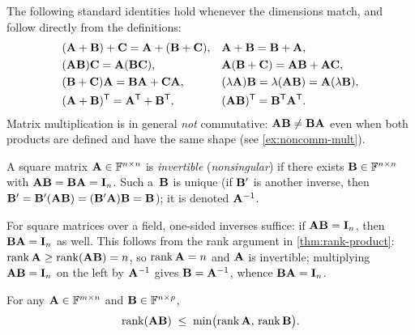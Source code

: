 \begin{remark}
\label{rem:matrix-op-laws}
The following standard identities hold whenever the dimensions match,
and follow directly from the definitions:
\begin{align*}
  &(\mathbf{A} + \mathbf{B}) + \mathbf{C} = \mathbf{A} + (\mathbf{B} + \mathbf{C}),
  & &\mathbf{A} + \mathbf{B} = \mathbf{B} + \mathbf{A}, \\
  &(\mathbf{A}\mathbf{B})\mathbf{C} = \mathbf{A}(\mathbf{B}\mathbf{C}),
  & &\mathbf{A}(\mathbf{B} + \mathbf{C}) = \mathbf{A}\mathbf{B} + \mathbf{A}\mathbf{C}, \\
  &(\mathbf{B} + \mathbf{C})\mathbf{A} = \mathbf{B}\mathbf{A} + \mathbf{C}\mathbf{A},
  & &(\lambda \mathbf{A})\mathbf{B} = \lambda(\mathbf{A}\mathbf{B}) = \mathbf{A}(\lambda \mathbf{B}), \\
  &(\mathbf{A} + \mathbf{B})^{\mathsf{T}} = \mathbf{A}^{\mathsf{T}} + \mathbf{B}^{\mathsf{T}},
  & &(\mathbf{A}\mathbf{B})^{\mathsf{T}} = \mathbf{B}^{\mathsf{T}} \mathbf{A}^{\mathsf{T}}.
\end{align*}
Matrix multiplication is in general \emph{not} commutative:
$\mathbf{A}\mathbf{B} \neq \mathbf{B}\mathbf{A}$ even when both products are
defined and have the same shape (see \cref{ex:noncomm-mult}).
\end{remark}

\begin{definition}
\label{def:invertible}
A square matrix $\mathbf{A} \in \mathbb{F}^{n \times n}$ is \emph{invertible}
(\emph{nonsingular}) if there exists $\mathbf{B} \in \mathbb{F}^{n \times n}$ with
$\mathbf{A}\mathbf{B} = \mathbf{B}\mathbf{A} = \mathbf{I}_n$. Such a~$\mathbf{B}$ is
unique (if $\mathbf{B}'$ is another inverse, then
$\mathbf{B}' = \mathbf{B}'(\mathbf{A}\mathbf{B}) = (\mathbf{B}'\mathbf{A})\mathbf{B} = \mathbf{B}$);
it is denoted $\mathbf{A}^{-1}$.
\end{definition}

\begin{remark}
For square matrices over a field, one-sided inverses suffice: if
$\mathbf{A}\mathbf{B} = \mathbf{I}_n$, then $\mathbf{B}\mathbf{A} = \mathbf{I}_n$ as
well. This follows from the rank argument in
\cref{thm:rank-product}: $\operatorname{rank} \mathbf{A} \ge \operatorname{rank}(\mathbf{A}\mathbf{B}) = n$,
so $\operatorname{rank} \mathbf{A} = n$ and $\mathbf{A}$ is invertible; multiplying
$\mathbf{A}\mathbf{B} = \mathbf{I}_n$ on the left by $\mathbf{A}^{-1}$ gives
$\mathbf{B} = \mathbf{A}^{-1}$, whence $\mathbf{B}\mathbf{A} = \mathbf{I}_n$.
\end{remark}

\begin{theorem}
\label{thm:rank-product}
For any $\mathbf{A} \in \mathbb{F}^{m \times n}$ and $\mathbf{B} \in \mathbb{F}^{n \times p}$,
\[
  \operatorname{rank}(\mathbf{A}\mathbf{B}) \;\le\; \min\bigl(\operatorname{rank} \mathbf{A},\, \operatorname{rank} \mathbf{B}\bigr).
\]
\end{theorem}

